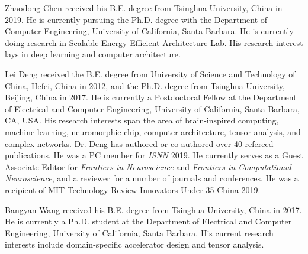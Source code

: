 \documentclass[10pt,journal,compsoc]{IEEEtran}
\begin{document}


\vspace{-30pt}
\begin{IEEEbiography} {Zhaodong Chen} received his B.E. degree from Tsinghua University, China in 2019. He is currently pursuing the Ph.D. degree with the Department of Computer Engineering, University of California, Santa Barbara. He is currently doing research in Scalable Energy-Efficient Architecture Lab. His research interest lays in deep learning and computer architecture.
\end{IEEEbiography}
\vspace{-60pt}
\begin{IEEEbiography} {Lei Deng} received the B.E. degree from University of Science and Technology of China, Hefei, China in 2012, and the Ph.D. degree from Tsinghua University, Beijing, China in 2017. He is currently a Postdoctoral Fellow at the Department of Electrical and Computer Engineering, University of California, Santa Barbara, CA, USA. His research interests span the area of brain-inspired computing, machine learning, neuromorphic chip, computer architecture, tensor analysis, and complex networks. Dr. Deng has authored or co-authored over 40 refereed publications. He was a PC member for \emph{ISNN} 2019. He currently serves as a Guest Associate Editor for \emph{Frontiers in Neuroscience} and \emph{Frontiers in Computational Neuroscience}, and a reviewer for a number of journals and conferences. He was a recipient of MIT Technology Review Innovators Under 35 China 2019.
\end{IEEEbiography}
\vspace{-40pt}
\begin{IEEEbiography} {Bangyan Wang} received his B.E. degree from Tsinghua University, China in 2017. He is currently a Ph.D. student at the Department of Electrical and Computer Engineering, University of California, Santa Barbara. His current research interests include domain-specific accelerator design and tensor analysis.
\end{IEEEbiography}
\vspace{-40pt}
\end{document}
